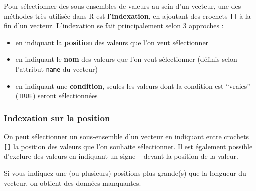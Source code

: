 \documentclass[
]{book}
\providecommand{\tightlist}{%
  \setlength{\itemsep}{0pt}\setlength{\parskip}{0pt}}
\begin{document}
Pour sélectionner des sous-ensembles de valeurs au sein d'un vecteur, une des méthodes très utilisée dans R est \textbf{l'indexation}, en ajoutant des crochets \texttt{{[}{]}} à la fin d'un vecteur. L'indexation se fait principalement selon 3 approches :

\begin{itemize}
\tightlist
\item
  en indiquant la \textbf{position} des valeurs que l'on veut sélectionner
\item
  en indiquant le \textbf{nom} des valeurs que l'on veut sélectionner (définis selon l'attribut \texttt{name} du vecteur)
\item
  en indiquant une \textbf{condition}, seules les valeurs dont la condition est ``vraies'' (\texttt{TRUE}) seront sélectionnées
\end{itemize}

\subsubsection{Indexation sur la position}\label{indexation-sur-la-position}

On peut sélectionner un sous-ensemble d'un vecteur en indiquant entre crochets \texttt{{[}{]}} la position des valeurs que l'on souhaite sélectionner. Il est également possible d'exclure des valeurs en indiquant un signe \texttt{-} devant la position de la valeur.

Si vous indiquez une (ou plusieurs) positions plus grande(s) que la longueur du vecteur, on obtient des données manquantes.
\end{document}
